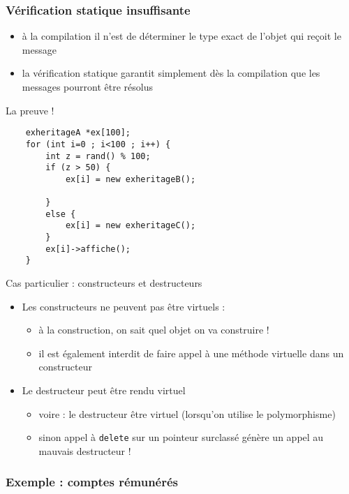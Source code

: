 \begin{frame}[fragile]\frametitle{Vérification statique insuffisante}
\begin{itemize}
	\item à la compilation il n'est  de déterminer le type exact de l'objet qui reçoit le message
	\item la vérification statique garantit simplement dès la compilation que les messages pourront être résolus
\end{itemize}
\begin{codeblock}{La preuve !}
\begin{lstlisting}
    exheritageA *ex[100];
    for (int i=0 ; i<100 ; i++) {
        int z = rand() % 100;
        if (z > 50) {
            ex[i] = new exheritageB();
            
        }
        else {
            ex[i] = new exheritageC();
        }
        ex[i]->affiche();
    }
\end{lstlisting}
\end{codeblock}
\end{frame}

\begin{frame}{Cas particulier : constructeurs et destructeurs}
\begin{itemize}
\item Les constructeurs ne peuvent pas être virtuels : 
\begin{itemize}
\item à la construction, on sait quel objet on va construire !
\item il est également interdit de faire appel à une méthode virtuelle dans un constructeur
\end{itemize}
\item Le destructeur peut être rendu virtuel
\begin{itemize}
\item voire : le destructeur  être virtuel (lorsqu'on utilise le polymorphisme)
\item sinon appel à \texttt{delete} sur un pointeur surclassé génère un appel au mauvais destructeur !
\end{itemize}
\end{itemize}
\end{frame}

\subsubsection{Exemple : comptes rémunérés}

